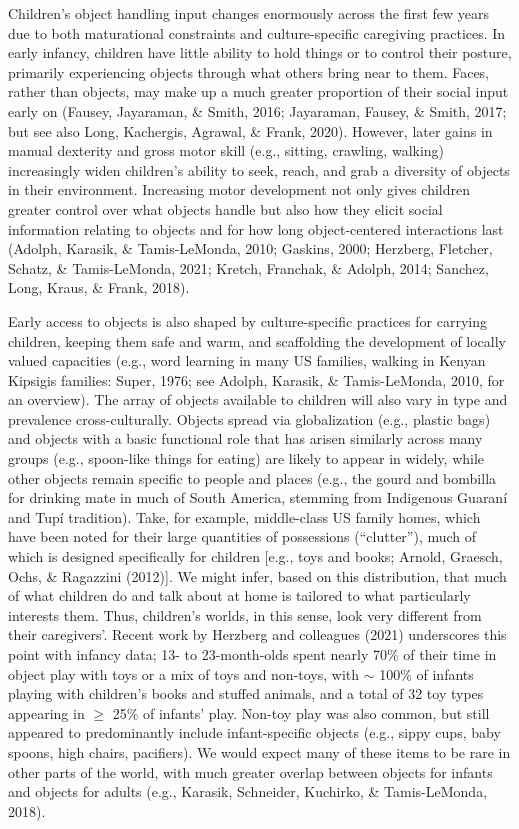 \documentclass[10pt, letterpaper]{article}
\begin{document}
Children's object handling input changes enormously across the first few
years due to both maturational constraints and culture-specific
caregiving practices. In early infancy, children have little ability to
hold things or to control their posture, primarily experiencing objects
through what others bring near to them. Faces, rather than objects, may
make up a much greater proportion of their social input early on
(Fausey, Jayaraman, \& Smith, 2016; Jayaraman, Fausey, \& Smith, 2017;
but see also Long, Kachergis, Agrawal, \& Frank, 2020). However, later
gains in manual dexterity and gross motor skill (e.g., sitting,
crawling, walking) increasingly widen children's ability to seek, reach,
and grab a diversity of objects in their environment. Increasing motor
development not only gives children greater control over what objects
handle but also how they elicit social information relating to objects
and for how long object-centered interactions last (Adolph, Karasik, \&
Tamis-LeMonda, 2010; Gaskins, 2000; Herzberg, Fletcher, Schatz, \&
Tamis-LeMonda, 2021; Kretch, Franchak, \& Adolph, 2014; Sanchez, Long,
Kraus, \& Frank, 2018).

Early access to objects is also shaped by culture-specific practices for
carrying children, keeping them safe and warm, and scaffolding the
development of locally valued capacities (e.g., word learning in many US
families, walking in Kenyan Kipsigis families: Super, 1976; see Adolph,
Karasik, \& Tamis-LeMonda, 2010, for an overview). The array of objects
available to children will also vary in type and prevalence
cross-culturally. Objects spread via globalization (e.g., plastic bags)
and objects with a basic functional role that has arisen similarly
across many groups (e.g., spoon-like things for eating) are likely to
appear in widely, while other objects remain specific to people and
places (e.g., the gourd and bombilla for drinking mate in much of South
America, stemming from Indigenous Guaraní and Tupí tradition). Take, for
example, middle-class US family homes, which have been noted for their
large quantities of possessions (``clutter''), much of which is designed
specifically for children {[}e.g., toys and books; Arnold, Graesch,
Ochs, \& Ragazzini (2012){]}. We might infer, based on this
distribution, that much of what children do and talk about at home is
tailored to what particularly interests them. Thus, children's worlds,
in this sense, look very different from their caregivers'. Recent work
by Herzberg and colleagues (2021) underscores this point with infancy
data; 13- to 23-month-olds spent nearly 70\% of their time in object
play with toys or a mix of toys and non-toys, with \(\sim\) 100\% of
infants playing with children's books and stuffed animals, and a total
of 32 toy types appearing in \(\ge\) 25\% of infants' play. Non-toy play
was also common, but still appeared to predominantly include
infant-specific objects (e.g., sippy cups, baby spoons, high chairs,
pacifiers). We would expect many of these items to be rare in other
parts of the world, with much greater overlap between objects for
infants and objects for adults (e.g., Karasik, Schneider, Kuchirko, \&
Tamis-LeMonda, 2018).
\end{document}
